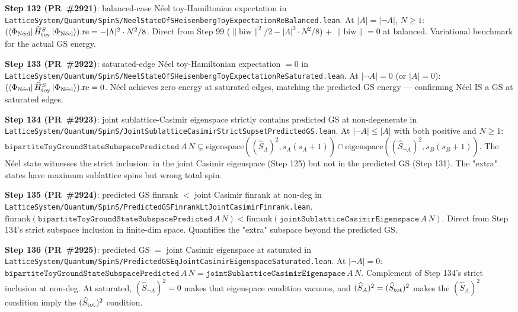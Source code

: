 \documentclass[a4paper,11pt]{article}
\begin{document}
\textbf{Step 132 (PR~\#2921)}: balanced-case N\'eel toy-Hamiltonian
expectation in
\texttt{LatticeSystem/Quantum/SpinS/NeelStateOfSHeisenbergToyExpectationReBalanced.lean}.
At $|A| = |\neg A|$, $N \ge 1$:
$(\langle\Phi_{\rm N\acute{e}el} |\,\widehat H_{\rm toy}^S\,
   | \Phi_{\rm N\acute{e}el}\rangle).\mathrm{re} = -|\Lambda|^2\cdot N^2/8$.
Direct from Step 99 ($\|\mathrm{biw}\|^2/2 - |\Lambda|^2\cdot N^2/8$)
+ $\|\mathrm{biw}\| = 0$ at balanced. Variational benchmark for
the actual GS energy.

\textbf{Step 133 (PR~\#2922)}: saturated-edge N\'eel toy-Hamiltonian
expectation $= 0$ in
\texttt{LatticeSystem/Quantum/SpinS/NeelStateOfSHeisenbergToyExpectationReSaturated.lean}.
At $|\neg A| = 0$ (or $|A| = 0$):
$(\langle\Phi_{\rm N\acute{e}el} |\,\widehat H_{\rm toy}^S\,
   | \Phi_{\rm N\acute{e}el}\rangle).\mathrm{re} = 0$.
N\'eel achieves zero energy at saturated edges, matching the
predicted GS energy --- confirming N\'eel IS a GS at saturated
edges.

\textbf{Step 134 (PR~\#2923)}: joint sublattice-Casimir eigenspace
strictly contains predicted GS at non-degenerate in
\texttt{LatticeSystem/Quantum/SpinS/JointSublatticeCasimirStrictSupsetPredictedGS.lean}.
At $|\neg A| \le |A|$ with both positive and $N \ge 1$:
$\mathtt{bipartiteToyGroundStateSubspacePredicted}\,A\,N \subsetneq
   \mathrm{eigenspace}((\widehat S_A)^2, s_A(s_A+1))
   \cap \mathrm{eigenspace}((\widehat S_{\neg A})^2, s_B(s_B+1))$.
The N\'eel state witnesses the strict inclusion: in the joint
Casimir eigenspace (Step 125) but not in the predicted GS
(Step 131). The "extra" states have maximum sublattice spins but
wrong total spin.

\textbf{Step 135 (PR~\#2924)}: predicted GS finrank $<$ joint Casimir
finrank at non-deg in
\texttt{LatticeSystem/Quantum/SpinS/PredictedGSFinrankLtJointCasimirFinrank.lean}.
$\mathrm{finrank}(\mathtt{bipartiteToyGroundStateSubspacePredicted}\,A\,N)
   < \mathrm{finrank}(\mathtt{jointSublatticeCasimirEigenspace}\,A\,N)$.
Direct from Step 134's strict subspace inclusion in finite-dim
space. Quantifies the "extra" subspace beyond the predicted GS.

\textbf{Step 136 (PR~\#2925)}: predicted GS $=$ joint Casimir
eigenspace at saturated in
\texttt{LatticeSystem/Quantum/SpinS/PredictedGSEqJointCasimirEigenspaceSaturated.lean}.
At $|\neg A| = 0$:
$\mathtt{bipartiteToyGroundStateSubspacePredicted}\,A\,N =
   \mathtt{jointSublatticeCasimirEigenspace}\,A\,N$.
Complement of Step 134's strict inclusion at non-deg. At saturated,
$(\widehat S_{\neg A})^2 = 0$ makes that eigenspace condition vacuous,
and $(\widehat S_A)^2 = (\widehat S_{\rm tot})^2$ makes the
$(\widehat S_A)^2$ condition imply the $(\widehat S_{\rm tot})^2$
condition.
\end{document}
